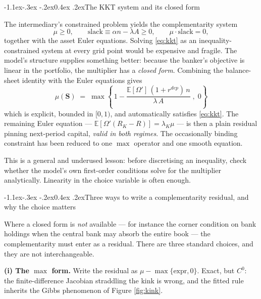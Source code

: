 \documentclass[10pt,a4paper]{article}
\makeatletter
\theoremstyle{definition}
\theoremstyle{plain}
\theoremstyle{remark}
\newcommand{\E}{\mathbb{E}}
\newcommand{\st}{\mathbf{S}}
\renewcommand\subsection{\@startsection{subsection}{2}{\z@}%
  {-1.1ex\@plus -.3ex \@minus -.2ex}{0.4ex \@plus .2ex}{\normalfont\normalsize\bfseries}}
\makeatother
\begin{document}
\subsection{The KKT system and its closed form}

The intermediary's constrained problem yields the complementarity system
\begin{equation}
  \mu \ge 0, \qquad \text{slack} \equiv \alpha n - \lambda A \ge 0, \qquad \mu\cdot\text{slack}=0,
  \label{eq:kkt}
\end{equation}
together with the asset Euler equations. Solving \eqref{eq:kkt} as an inequality-constrained
system at every grid point would be expensive and fragile. The model's structure supplies
something better: because the banker's objective is linear in the portfolio, the multiplier
has a \emph{closed form}. Combining the balance-sheet identity with the Euler equations gives
\begin{equation}
  \boxed{\;\mu(\st) \;=\; \max\!\left\{\,1 - \frac{\E[\Omega']\,(1+r^{dep})\,n}{\lambda\,A}\;,\;0\right\}\;}
  \label{eq:muclosed}
\end{equation}
which is explicit, bounded in $[0,1)$, and automatically satisfies \eqref{eq:kkt}. The
remaining Euler equation --- $\E[\Omega'(R_K - R)] = \lambda_K\mu$ --- is then a plain residual
pinning next-period capital, \emph{valid in both regimes}. The occasionally binding constraint
has been reduced to one $\max$ operator and one smooth equation.

This is a general and underused lesson: before discretising an inequality, check whether the
model's own first-order conditions solve for the multiplier analytically. Linearity in the
choice variable is often enough.

\subsection{Three ways to write a complementarity residual, and why the choice matters}

Where a closed form is \emph{not} available --- for instance the corner condition on bank
holdings when the central bank may absorb the entire book --- the complementarity must enter
as a residual. There are three standard choices, and they are not interchangeable.

\textbf{(i) The $\max$ form.} Write the residual as $\mu - \max\{\text{expr},0\}$. Exact,
but $C^0$: the finite-difference Jacobian straddling the kink is wrong, and the fitted rule
inherits the Gibbs phenomenon of Figure \ref{fig:kink}.
\end{document}
